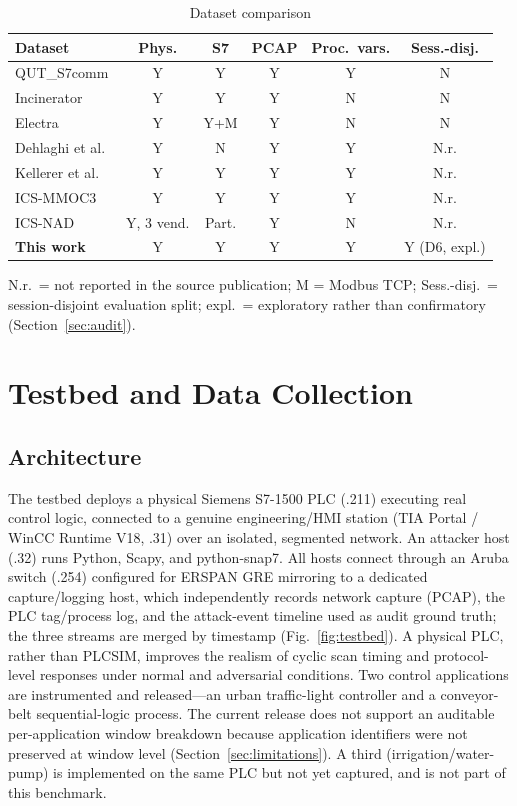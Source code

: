 \documentclass[conference]{IEEEtran}
\begin{document}
\begin{table}[t]
\caption{Dataset comparison}
\label{tab:compare}
\centering
\small
\begin{tabular}{lccccc}
\toprule
Dataset & Phys. & S7 & PCAP & Proc.\ vars. & Sess.-disj. \\
\midrule
QUT\_S7comm \cite{b3}     & Y & Y   & Y & Y & N \\
Incinerator \cite{b4}     & Y & Y   & Y & N & N \\
Electra \cite{b5}         & Y & Y+M & Y & N & N \\
Dehlaghi et al.\ \cite{b6}& Y & N   & Y & Y & N.r. \\
Kellerer et al.\ \cite{b10}& Y& Y   & Y & Y & N.r. \\
ICS-MMOC3 \cite{b12}      & Y & Y   & Y & Y & N.r. \\
ICS-NAD \cite{b13}        & Y, 3 vend. & Part. & Y & N & N.r. \\
\textbf{This work}        & Y & Y   & Y & Y & Y (D6, expl.) \\
\bottomrule
\end{tabular}

\vspace{2pt}
\raggedright
\footnotesize N.r.\ = not reported in the source publication; M = Modbus TCP; Sess.-disj.\ =
session-disjoint evaluation split; expl.\ = exploratory rather than confirmatory
(Section~\ref{sec:audit}).
\end{table}

\section{Testbed and Data Collection}

\subsection{Architecture}

The testbed deploys a physical Siemens S7-1500 PLC (.211) executing real control logic, connected to a
genuine engineering/HMI station (TIA Portal / WinCC Runtime V18, .31) over an isolated, segmented network.
An attacker host (.32) runs Python, Scapy, and python-snap7. All hosts connect through an Aruba switch
(.254) configured for ERSPAN GRE mirroring to a dedicated capture/logging host, which independently
records network capture (PCAP), the PLC tag/process log, and the attack-event timeline used as audit
ground truth; the three streams are merged by timestamp (Fig.~\ref{fig:testbed}). A physical PLC, rather
than PLCSIM, improves the realism of cyclic scan timing and protocol-level responses under normal and
adversarial conditions. Two control applications are instrumented and released---an urban traffic-light
controller and a conveyor-belt sequential-logic process. The current release does not support an
auditable per-application window breakdown because application identifiers were not preserved at window
level (Section~\ref{sec:limitations}). A third (irrigation/water-pump) is implemented on the same PLC but
not yet captured, and is not part of this benchmark.
\end{document}
